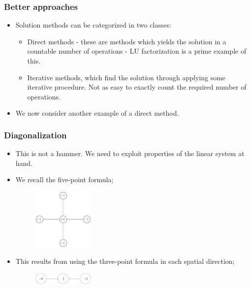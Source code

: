 \documentclass{beamer}
\begin{document}
\begin{frame}\frametitle{Better approaches}
  \begin{itemize}
    \item Solution methods can be categorized in two classes: 
      \begin{itemize}
        \item Direct methods - these are methods which yields the solution in
          a countable number of operations - LU factorization is a prime example of this.
        \item Iterative methods, which find the solution through applying some
          iterative procedure. Not as easy to exactly count the required number
          of operations.
      \end{itemize}
    \item We now consider another example of a direct method.
  \end{itemize}
\end{frame}
\begin{frame}\frametitle{Diagonalization}
  \begin{itemize}
    \item This is not a hammer. We need to exploit properties of the linear system at hand.
    \item We recall the five-point formula;
      \begin{figure}[H]
        \begin{center}
          \includegraphics[width=3cm]{../../notes/07.poisson-fdm/FivePointStencil}
        \end{center}
      \end{figure}
    \item This results from using the three-point formula in each spatial direction;
      \begin{figure}[H]
        \begin{center}
          \includegraphics[width=3cm]{../../notes/07.poisson-fdm/ThreePointStencil}
        \end{center}
      \end{figure}
  \end{itemize}
\end{frame}
\end{document}
